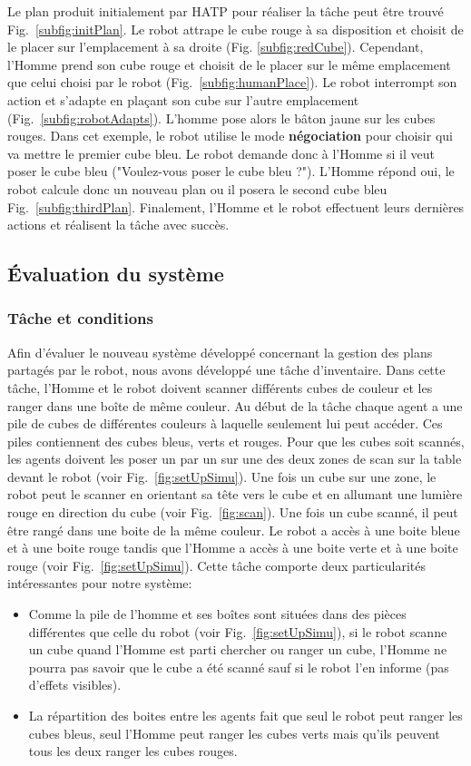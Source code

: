 \documentclass[english,a4paper,11pt,twoside]{StyleThese}
\begin{document}
Le plan produit initialement par HATP pour réaliser la tâche peut être trouvé Fig.~\ref{subfig:initPlan}. Le robot attrape le cube rouge à sa disposition et choisit de le placer sur l'emplacement à sa droite (Fig. \ref{subfig:redCube}). Cependant, l'Homme prend son cube rouge et choisit de le placer sur le même emplacement que celui choisi par le robot (Fig.~\ref{subfig:humanPlace}). Le robot interrompt son action et s'adapte en plaçant son cube sur l'autre emplacement (Fig.~\ref{subfig:robotAdapts}). L'homme pose alors le bâton jaune sur les cubes rouges. Dans cet exemple, le robot utilise le mode \textbf{négociation} pour choisir qui va mettre le premier cube bleu. Le robot demande donc à l'Homme si il veut poser le cube bleu ("Voulez-vous poser le cube bleu ?"). L'Homme répond oui, le robot calcule donc un nouveau plan ou il posera le second cube bleu Fig.~\ref{subfig:thirdPlan}. Finalement, l'Homme et le robot effectuent leurs dernières actions et réalisent la tâche avec succès.

\newpage
\subsection{Évaluation du système}

\subsubsection{Tâche et conditions}

Afin d'évaluer le nouveau système développé concernant la gestion des plans partagés par le robot, nous avons développé une tâche d'inventaire. Dans cette tâche, l'Homme et le robot doivent scanner différents cubes de couleur et les ranger dans une boîte de même couleur. Au début de la tâche chaque agent a une pile de cubes de différentes couleurs à laquelle seulement lui peut accéder. Ces piles contiennent des cubes bleus, verts et rouges. Pour que les cubes soit scannés, les agents doivent les poser un par un sur une des deux zones de scan sur la table devant le robot (voir Fig.~\ref{fig:setUpSimu}). Une fois un cube sur une zone, le robot peut le scanner en orientant sa tête vers le cube et en allumant une lumière rouge en direction du cube (voir Fig.~\ref{fig:scan}). Une fois un cube scanné, il peut être rangé dans une boite de la même couleur. Le robot a accès à une boite bleue et à une boite rouge tandis que l'Homme a accès à une boite verte et à une boite rouge (voir Fig.~\ref{fig:setUpSimu}). Cette tâche comporte deux particularités intéressantes pour notre système:
\begin{itemize}
\item Comme la pile de l'homme et ses boîtes sont situées dans des pièces différentes que celle du robot (voir Fig.~\ref{fig:setUpSimu}), si le robot scanne un cube quand l'Homme est parti chercher ou ranger un cube, l'Homme ne pourra pas savoir que le cube a été scanné sauf si le robot l'en informe (pas d'effets visibles).
\item La répartition des boites entre les agents fait que seul le robot peut ranger les cubes bleus, seul l'Homme peut ranger les cubes verts mais qu'ils peuvent tous les deux ranger les cubes rouges.
\end{itemize}
\end{document}
